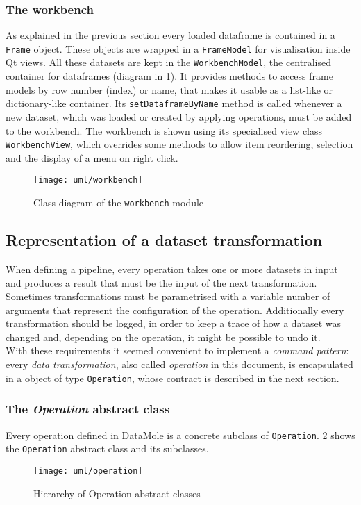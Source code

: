 \clearpage
\subsubsection{The workbench}
As explained in the previous section every loaded dataframe is contained in a \texttt{Frame} object. These objects are wrapped in a \texttt{FrameModel} for visualisation inside Qt views. All these datasets are kept in the \texttt{WorkbenchModel}, the centralised container for dataframes (diagram in \cref{fig:workbench_uml}).
It provides methods to access frame models by row number (index) or name, that makes it usable as a list-like or dictionary-like container. Its \texttt{setDataframeByName} method is called whenever a new dataset, which was loaded or created by applying operations, must be added to the workbench.
The workbench is shown using its specialised view class \texttt{WorkbenchView}, which overrides some methods to allow item reordering, selection and the display of a menu on right click.
\begin{figure}
	\centering
	\texttt{[image: uml/workbench]}
	\caption{Class diagram of the \texttt{workbench} module}
	\label{fig:workbench_uml}
\end{figure} 


\subsection{Representation of a dataset transformation}
When defining a pipeline, every operation takes one or more datasets in input and produces a result that must be the input of the next transformation. Sometimes transformations must be parametrised with a variable number of arguments that represent the configuration of the operation. Additionally every transformation should be logged, in order to keep a trace of how a dataset was changed and, depending on the operation, it might be possible to undo it.\\
With these requirements it seemed convenient to implement a \textit{command pattern}: every \textit{data transformation}, also called \textit{operation} in this document, is encapsulated in a object of type \texttt{Operation}, whose contract is described in the next section. 

\subsubsection{The \textit{Operation} abstract class}
Every operation defined in DataMole is a concrete subclass of \texttt{Operation}. \cref{fig:operationuml} shows the \texttt{Operation} abstract class and its subclasses.
\begin{figure}
	\centering
	\texttt{[image: uml/operation]}
	\caption[Hierarchy of Operation interfaces]{Hierarchy of Operation abstract classes}
	\label{fig:operationuml}
\end{figure}

